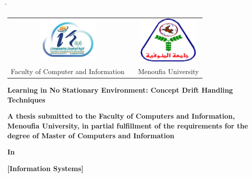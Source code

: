 

\begin{titlepage}
	\begin{tabbing}
		\hspace{1cm} %
		\= \kill %
		\begin{tabular}{ccc} %
			\includegraphics[width=3cm]{0_frontmatter/figures/PNG/faculty_image.png} & \hspace{2.5cm} & \includegraphics[width=3cm]{0_frontmatter/figures/PNG/menoufia_logo.png} \\
			\multicolumn{1}{l}{Faculty of Computer and Information}                  & \hspace{2.5cm} & \multicolumn{1}{l}{Menoufia  University}                                 \\
		\end{tabular}
	\end{tabbing}
	\begin{center}
		\vspace{0.5cm}

		\textbf{\Huge \normalfont Learning in No Stationary Environment: Concept Drift Handling Techniques}
		\vspace{0.3cm}

		\textbf{\large \normalfont A thesis submitted to the Faculty of Computers and Information, Menoufia University, in partial fulfillment of the requirements for the degree of Master of Computers and Information} \\
		\vspace{0.2cm}

		\textbf{\large In} \\
		\vspace{0.2cm}

		\textbf{\Large [Information Systems]} \\
		\vspace{0.5cm}


\end{center}
\end{titlepage}

